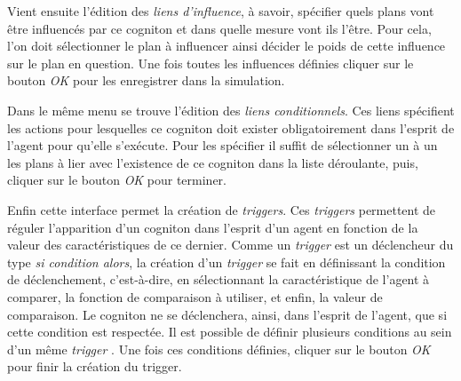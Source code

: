 Vient ensuite l'édition des \textit{liens d'influence}, à savoir, spécifier quels plans vont être influencés par ce cogniton et dans quelle mesure vont ils l'être. Pour cela, l'on doit sélectionner le plan à influencer ainsi décider le poids de cette influence sur le plan en question. Une fois toutes les influences définies cliquer sur le bouton \textit{OK} pour les enregistrer dans la simulation.

Dans le même menu se trouve l'édition des\textit{ liens conditionnels}. Ces liens spécifient les actions pour lesquelles ce cogniton doit exister obligatoirement dans l'esprit de l'agent pour qu'elle s'exécute. Pour les spécifier il suffit de sélectionner un à un les plans à lier avec l'existence de ce cogniton dans la liste déroulante, puis, cliquer sur le bouton \textit{OK} pour terminer.

Enfin cette interface permet la création de \textit{triggers}. Ces \textit{triggers} permettent de réguler l'apparition d'un cogniton dans l'esprit d'un agent en fonction de la valeur des caractéristiques de ce dernier. Comme un \textit{trigger} est un déclencheur du type \textit{si condition alors}, la création d'un \textit{trigger} se fait en définissant la condition de déclenchement, c'est-à-dire, en sélectionnant la caractéristique de l'agent à comparer, la fonction de comparaison à utiliser, et enfin, la valeur de comparaison. Le cogniton ne se déclenchera, ainsi, dans l'esprit de l'agent, que si cette condition est respectée. 
Il est possible de définir plusieurs conditions au sein d'un même 
 \textit{trigger} . Une fois ces conditions définies, cliquer sur le bouton \textit{OK} pour finir la création du trigger.
 

	
